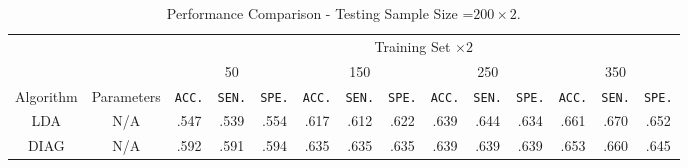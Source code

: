 \documentclass{article}
\begin{document}


\begin{table*}
\footnotesize{
\begin{center}
\caption{Performance Comparison - Testing Sample Size =$200\times 2$.}
		\label{tab:table11}
\begin{tabular}{*{14}{c}}
\toprule
    & & \multicolumn{12}{c}{Training Set $\times 2$}\\
    \cmidrule(lr){3-14}
    & & 
    \multicolumn{3}{c}{50} &
    \multicolumn{3}{c}{150} &
    \multicolumn{3}{c}{250} &
    \multicolumn{3}{c}{350} \\
\cmidrule(lr){3-5}
\cmidrule(lr){6-8}
\cmidrule(lr){9-11}
\cmidrule(lr){12-14}
Algorithm & Parameters & \texttt{ACC.} & \texttt{SEN.} & \texttt{SPE.} &
						\texttt{ACC.} & \texttt{SEN.} & \texttt{SPE.} &
                           \texttt{ACC.} & \texttt{SEN.} & \texttt{SPE.} &
                           \texttt{ACC.} & \texttt{SEN.} & \texttt{SPE.} \\
 \cmidrule(lr){1-2}                        
 \cmidrule(lr){3-5}
\cmidrule(lr){6-8}
\cmidrule(lr){9-11}
\cmidrule(lr){12-14}
    LDA & N/A &   .547 & .539 & .554 &     .617 & .612 & .622     & .639 & .644 & .634     & .661 & .670 & .652 \\
 
     \cmidrule(lr){1-2}                        
 \cmidrule(lr){3-5}
\cmidrule(lr){6-8}
\cmidrule(lr){9-11}
\cmidrule(lr){12-14}
    DIAG & N/A &   .592 & .591 & .594 &     .635 & .635 & .635   &     .639 & .639& .639   & .653 & .660 & .645   \\
    \cmidrule(lr){1-2}                        
 \cmidrule(lr){3-5}
\cmidrule(lr){6-8}
\cmidrule(lr){9-11}
\cmidrule(lr){12-14}


\end{tabular}
\end{center}}
\end{table*}
\end{document}
